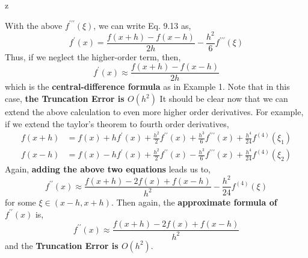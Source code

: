 z\documentclass[a4paper,12pt,twoside]{book}
\newcommand{\nll}[0]{\newline\newline}
\begin{document}
With the above $f^{\prime\prime\prime}(\xi)$, we can write Eq. 9.13 as,
\begin{equation}
    f^{\prime}(x) = \frac{f(x+h) - f(x-h)}{2h} - \frac{h^2}{6}{f^{\prime\prime\prime}(\xi)}
\end{equation}
Thus, if we neglect the higher-order term, then,
\begin{equation}
    f^\prime(x) \approx \frac{f(x+h) - f(x-h)}{2h}
\end{equation}
which is the \textbf{central-difference formula} as in Example 1.
\nll
Note that in this case, \textbf{the Truncation Error is $O(h^2)$}
\nll
It should be clear now that we can extend the above calculation to even more higher order derivatives. For example, if we extend the taylor's theorem to fourth order derivatives,
\begin{equation}
    \begin{split}
        f(x+h) &= f(x) + hf^\prime(x) + \frac{h^2}{2}f^{\prime\prime}(x) + \frac{h^3}{6}f^{\prime\prime\prime}(x) + \frac{h^4}{24}f^{(4)}(\xi_1)\\
        f(x-h) &= f(x) - hf^\prime(x) + \frac{h^2}{2}f^{\prime\prime}(x) - \frac{h^3}{6}f^{\prime\prime\prime}(x) + \frac{h^4}{24}f^{(4)}(\xi_2)
    \end{split}
\end{equation}
Again, \textbf{adding the above two equations} leads us to,
\begin{equation}
    f^{\prime\prime}(x) \approx \frac{f(x+h) - 2f(x) + f(x-h)}{h^2} - \frac{h^2}{24}f^{(4)}(\xi)
\end{equation}
for some $\xi \in (x-h,x+h)$. Then again, the \textbf{approximate formula of $f^{\prime\prime}(x)$} is,
\begin{equation}
    f^{\prime\prime}(x) \approx \frac{f(x+h) - 2f(x) + f(x-h)}{h^2}
\end{equation}
and the \textbf{Truncation Error is $O(h^2)$}.
\end{document}
